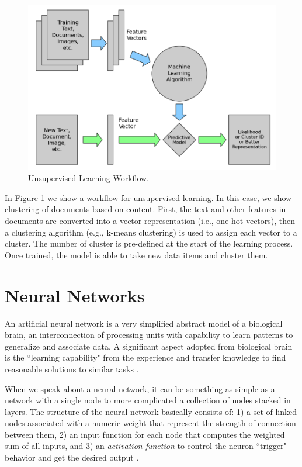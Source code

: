 \documentclass[12pt]{report}
\begin{document}
\begin{figure}[H]	
	\centering
	\includegraphics[width=150mm, scale = 1]{images/2-Unsupervised_Learning.png}	
	\caption{Unsupervised Learning Workflow.}	
	\label{figure:Unsupervised_Learning}
\end{figure}

In Figure \ref{figure:Unsupervised_Learning} we show a workflow for unsupervised learning. In this case, we show clustering of documents based on content. First, the text and other features in documents are converted into a vector representation (i.e., one-hot vectors), then a clustering algorithm (e.g., k-means clustering) is used to assign each vector to a cluster. The number of cluster is pre-defined at the start of the learning process.
Once trained, the model is able to take new data items and cluster them.

\section{Neural Networks}
An artificial neural network is a very simplified abstract model of a biological brain, an interconnection of processing units with capability to learn patterns to generalize and associate data. A significant aspect adopted from biological brain is the ``learning capability" from the experience and transfer knowledge to find reasonable solutions to similar tasks \cite{ Gurney2004} \cite{ Kriesel2005}.

When we speak about a neural network, it can be something as simple as a network with a single node to more complicated a collection of nodes stacked in layers\cite{ Kriesel2005}. The structure of  the neural network basically consists of:  1) a set of linked nodes  associated with a numeric weight that represent the strength of connection between them, 2) an input function for each node that computes the weighted sum of all inputs, and 3) an {\em activation function} to control the neuron ``trigger" behavior and get the desired output \cite{ Kriesel2005} \cite{Russell2010}. 
\end{document}
